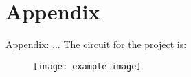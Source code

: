 \section*{Appendix}

\begin{frame}{Appendix: ...}
The circuit for the project is:
\begin{figure}[!h]
    \centering
    \texttt{[image: example-image]}
\end{figure}
\end{frame}
